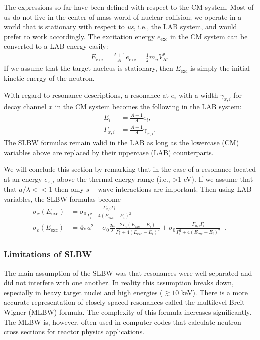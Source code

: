 \documentclass[11pt]{article}
\begin{document}
The expressions so far have been defined with respect to the CM system.  Most of us do not live in the center-of-mass world of nuclear collision; we operate in a world that is stationary with respect to \emph{us}, i.e., the LAB system, and would prefer to work accordingly.  The excitation energy \(e_\text{exc}\) in the CM system can be converted to a LAB energy easily:
\begin{align}
  E_\text{exc} = \frac{A+1}{A}e_\text{exc} = \frac{1}{2} m_n V_R^2.
\end{align}
If we assume that the target nucleus is stationary, then \(E_\text{exc}\) is simply the initial kinetic energy of the neutron.

With regard to resonance descriptions, a resonance at \(e_i\) with a width \(\gamma_{x,i}\) for decay channel \(x\) in the CM system becomes the following in the LAB system:
\begin{align}
  E_i &= \frac{A+1}{A} e_i, \\
  \Gamma_{x,i} &= \frac{A+1}{A} \gamma_{x,i}.
\end{align}
The SLBW formulas remain valid in the LAB as long as the lowercase (CM) variables above are replaced by their uppercase (LAB) counterparts.

We will conclude this section by remarking that in the case of a resonance located at an energy \(e_{x,i}\) above the thermal energy range (i.e., >1 eV).  If we assume that that \(a/\lambda << 1\) then only \(s-\text{wave}\) interactions are important.  Then using LAB variables, the SLBW formulas become
\begin{align}
  \label{eq::simpleSLBW1}
  \sigma_x(E_\text{exc}) &=  \sigma_0 \frac{\Gamma_{x,i} \Gamma_i}{\Gamma_i^2 + 4\left(E_\text{exc} - E_i\right)^2} \\
  \label{eq::simpleSLBW2}
  \sigma_e(E_\text{exc}) &= 4\pi a^2 
         + \sigma_0 \frac{2a}{\lambda} \frac{2\Gamma_i\left(E_\text{exc} - E_i\right)}{\Gamma_i^2 + 4\left(E_\text{exc} - E_i\right)^2}
         + \sigma_0 \frac{\Gamma_{n,i} \Gamma_i}{\Gamma_i^2 + 4\left(E_\text{exc} - E_i\right)^2} \;\;.
\end{align}

\subsubsection{Limitations of SLBW}
\label{sec:orgheadline16}
The main assumption of the SLBW was that resonances were well-separated and did not interfere with one another.  In reality this assumption breaks down, especially in heavy target nuclei and high energies (\(\gtrsim 10\) keV).  There is a more accurate representation of closely-spaced resonances called the multilevel Breit-Wigner (MLBW) formula.  The complexity of this formula increases significantly.  The MLBW is, however, often used in computer codes that calculate neutron cross sections for reactor physics applications.
\end{document}
